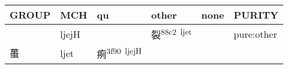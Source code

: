 \documentclass[14pt,a4paper]{scrartcl}
\begin{document}
\begin{longtable}[c]{@{}llllll@{}}
\toprule
\begin{minipage}[b]{0.14\columnwidth}\raggedright\strut
GROUP
\strut\end{minipage} &
\begin{minipage}[b]{0.14\columnwidth}\raggedright\strut
MCH
\strut\end{minipage} &
\begin{minipage}[b]{0.14\columnwidth}\raggedright\strut
qu
\strut\end{minipage} &
\begin{minipage}[b]{0.14\columnwidth}\raggedright\strut
other
\strut\end{minipage} &
\begin{minipage}[b]{0.14\columnwidth}\raggedright\strut
none
\strut\end{minipage} &
\begin{minipage}[b]{0.14\columnwidth}\raggedright\strut
PURITY
\strut\end{minipage}\tabularnewline
\midrule
\endhead
\begin{minipage}[t]{0.14\columnwidth}\raggedright\strut
𠜊
\strut\end{minipage} &
\begin{minipage}[t]{0.14\columnwidth}\raggedright\strut
ljejH
\strut\end{minipage} &
\begin{minipage}[t]{0.14\columnwidth}\raggedright\strut
\strut\end{minipage} &
\begin{minipage}[t]{0.14\columnwidth}\raggedright\strut
裂\textsuperscript{88c2~ljet}
\strut\end{minipage} &
\begin{minipage}[t]{0.14\columnwidth}\raggedright\strut
\strut\end{minipage} &
\begin{minipage}[t]{0.14\columnwidth}\raggedright\strut
pure:other
\strut\end{minipage}\tabularnewline
\begin{minipage}[t]{0.14\columnwidth}\raggedright\strut
蠆
\strut\end{minipage} &
\begin{minipage}[t]{0.14\columnwidth}\raggedright\strut
ljet
\strut\end{minipage} &
\begin{minipage}[t]{0.14\columnwidth}\raggedright\strut
㾐\textsuperscript{3f90~ljejH}
\strut\end{minipage} &

\end{longtable}
\end{document}
